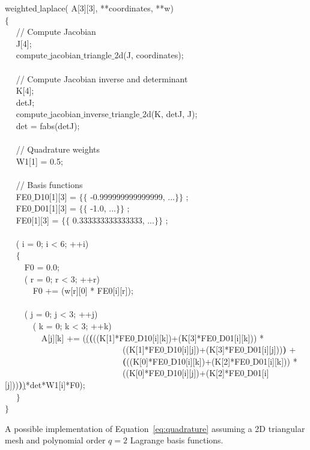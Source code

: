 \begin{algorithm}
\scriptsize
{}

 weighted$\_$laplace( A[3][3],  **coordinates,  **w) \\
$\lbrace$ \\
~~  // Compute Jacobian \\
~~   J[4]; \\
~~  compute$\_$jacobian$\_$triangle$\_$2d(J, coordinates); \\
~~\\
~~  // Compute Jacobian inverse and determinant \\
~~   K[4]; \\
~~   detJ; \\
~~  compute$\_$jacobian$\_$inverse$\_$triangle$\_$2d(K, detJ, J); \\
~~   det = fabs(detJ); \\
~~\\
~~  // Quadrature weights \\
~~   W1[1] = {0.5}; \\
~~\\
~~  // Basis functions \\
~~   FE0$\_$D10[1][3] = $\lbrace\lbrace$ -0.999999999999999, ...$\rbrace\rbrace$ ;\\
~~   FE0$\_$D01[1][3] = $\lbrace\lbrace$ -1.0, ...$\rbrace\rbrace$ ;\\
~~   FE0[1][3] = $\lbrace\lbrace$ 0.333333333333333, ...$\rbrace\rbrace$ ;\\
~~\\
~~   ( i = 0; i < 6; ++i)\\
~~  $\lbrace$\\
~~~~   F0  = 0.0;\\
~~~~   ( r  = 0; r < 3; ++r)\\
~~~~~~  F0 += (w[r][0] * FE0[i][r]);\\
~~\\
~~~~   ( j = 0; j < 3; ++j)\\
~~~~~~     ( k = 0; k < 3; ++k)\\
~~~~~~~~      A[j][k] += (\underline{(}\textbf{(}((K[1]*FE0$\_$D10[i][k])+(K[3]*FE0$\_$D01[i][k])) * \\
~~~~~~~~~~~~~~~~~~~~~~~~~~~~((K[1]*FE0$\_$D10[i][j])+(K[3]*FE0$\_$D01[i][j]))\textbf{)} + \\
~~~~~~~~~~~~~~~~~~~~~~~~~~~~\textbf{(}((K[0]*FE0$\_$D10[i][k])+(K[2]*FE0$\_$D01[i][k])) * \\
~~~~~~~~~~~~~~~~~~~~~~~~~~~~((K[0]*FE0$\_$D10[i][j])+(K[2]*FE0$\_$D01[i][j]))\textbf{)}\underline{)}*det*W1[i]*F0);\\
~~  $\rbrace$\\
$\rbrace$
\caption{A possible implementation of Equation~\ref{eq:quadrature} assuming a 2D triangular mesh and polynomial order $q=2$ Lagrange basis functions.}
\label{code:weighted-laplace}
\end{algorithm}

